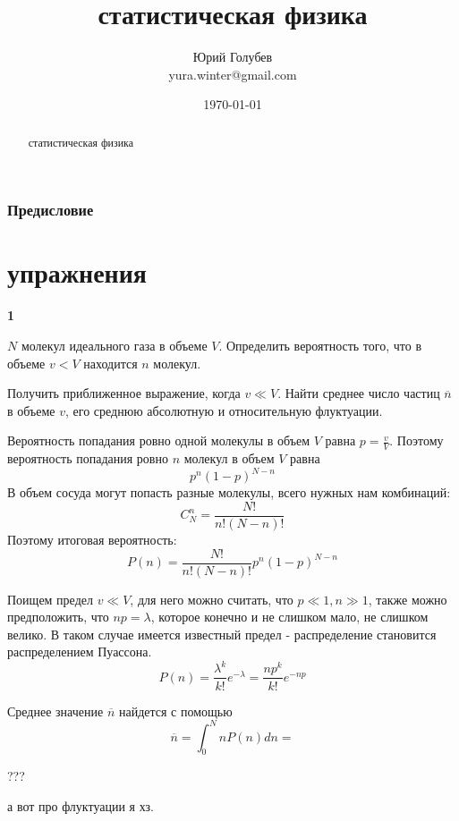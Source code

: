 \documentclass[a4paper,12pt]{article} %
\author{Юрий Голубев\\ yura.winter@gmail.com }
\title{статистическая физика}
\date{\today}
\begin{document}
\maketitle

\begin{abstract}
статистическая физика
\end{abstract}
\tableofcontents

\section*{Предисловие}




\clearpage
\part{упражнения}


\begin{task}\textbf{1}

$ N $ молекул идеального газа в объеме $ V $. 
Определить вероятность того, что в объеме $v < V$ находится $ n $ молекул.

Получить приближенное выражение, когда  $v \ll V $. 
Найти среднее число частиц $\overline{n}$ в объеме $ v $, его среднюю абсолютную и относительную флуктуации.  

Вероятность попадания ровно одной молекулы в объем $ V$ равна $ p=\frac{v}{V}$. 
Поэтому вероятность попадания ровно $n$ молекул в объем $V$ равна 
\[ p^n (1-p)^{N-n} \]
В объем сосуда могут попасть разные молекулы, всего нужных нам комбинаций:
\[ C_N^n =\frac{N!}{n!(N-n)!}\]
Поэтому итоговая вероятность:
\[ P(n)=\frac{N!}{n!(N-n)!}p^n (1-p)^{N-n} \]

Поищем предел $v \ll V$,  для него можно считать, что $ p\ll 1, n\gg 1$, также можно предположить, что $ np=\lambda$, которое конечно и не слишком мало, не слишком велико.
В таком случае имеется известный предел - распределение становится распределением Пуассона.
\[ P(n)=\frac{\lambda^k}{k!}e^{-\lambda}=
\frac{np^k}{k!}e^{-np}\]

Среднее значение $\overline{n}$ найдется с помощью
\[ \overline{n}=\int_0^N n P(n) dn= \]

???

а вот про флуктуации я хз.

\end{task}
\end{document}
